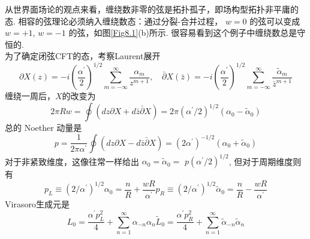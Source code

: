 从世界面场论的观点来看，缠绕数非零的弦是拓扑孤子，即场构型拓扑非平庸的态. 相容的弦理论必须纳入缠绕数态：通过分裂-合并过程， $w=0$ 的弦可以变成 $w=+1$, $w=-1$ 的弦，如图\ref{Fig8.1}(b)所示. 很容易看到这个例子中缠绕数总是守恒的. \\
为了确定闭弦CFT的态，考察Laurent展开
\begin{equation}
	\partial X(z)=-i\left(\frac{\alpha^{\prime}}{2}\right)^{1 / 2} \sum_{m=-\infty}^{\infty} \frac{\alpha_{m}}{z^{m+1}}, \quad \bar{\partial} X(\bar{z})=-i\left(\frac{\alpha^{\prime}}{2}\right)^{1 / 2} \sum_{m=-\infty}^{\infty} \frac{\tilde{\alpha}_{m}}{\bar{z}^{m+1}}
\end{equation}
缠绕一周后，$X$的改变为
\begin{equation}
	2 \pi R w=\oint(d z \partial X+d \bar{z} \bar{\partial} X)=2 \pi\left(\alpha^{\prime} / 2\right)^{1 / 2}\left(\alpha_{0}-\tilde{\alpha}_{0}\right)
\end{equation}
总的 Noether 动量是
\begin{equation}
	p=\frac{1}{2 \pi \alpha^{\prime}} \oint(d z \partial X-d \bar{z} \bar{\partial} X)=\left(2 \alpha^{\prime}\right)^{-1 / 2}\left(\alpha_{0}+\tilde{\alpha}_{0}\right)
\end{equation}
对于非紧致维度，这像往常一样给出 $\alpha_{0}=\tilde{\alpha}_{0}=$ $p\left(\alpha^{\prime} / 2\right)^{1 / 2}$, 但对于周期维度则有
\begin{subequations}
\begin{equation}
p_{L} \equiv\left(2 / \alpha^{\prime}\right)^{1 / 2} \alpha_{0}=\frac{n}{R}+\frac{w R}{\alpha^{\prime}} 
\end{equation}	
\begin{equation}
p_{R} \equiv\left(2 / \alpha^{\prime}\right)^{1 / 2} \tilde{\alpha}_{0}=\frac{n}{R}-\frac{w R}{\alpha^{\prime}}
\end{equation}		
\end{subequations}
Virasoro生成元是
\begin{subequations}
\begin{equation}
L_{0}=\frac{\alpha^{\prime} p_{L}^{2}}{4}+\sum_{n=1}^{\infty} \alpha_{-n} \alpha_{n}
\end{equation}
\begin{equation}
\tilde{L}_{0}=\frac{\alpha^{\prime} p_{R}^{2}}{4}+\sum_{n=1}^{\infty} \tilde{\alpha}_{-n} \tilde{\alpha}_{n}
\end{equation}		 				
\end{subequations}


